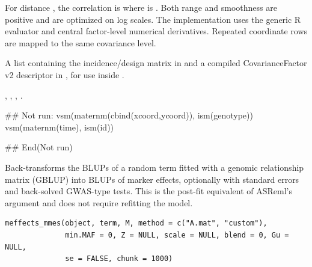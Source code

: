 \documentclass[a4paper]{book}
\begin{document}
%
\begin{Details}\relax
For distance , the correlation is  where \eqn{\phi}{} is .  Both range and smoothness are positive and are optimized on log scales.  The implementation uses the generic R evaluator and central factor-level numerical derivatives.  Repeated coordinate rows are mapped to the same covariance level.
\end{Details}
%
\begin{Value}
A list containing the incidence/design matrix in  and a compiled CovarianceFactor v2 descriptor in , for use inside .
\end{Value}
%
\begin{SeeAlso}\relax
{}, , , .
\end{SeeAlso}
%
\begin{Examples}
\begin{ExampleCode}
## Not run: 
vsm(maternm(cbind(xcoord,ycoord)), ism(genotype))
vsm(maternm(time), ism(id))

## End(Not run)
\end{ExampleCode}
\end{Examples}
%
\begin{Description}\relax
Back-transforms the BLUPs of a random term fitted with a genomic relationship
matrix (GBLUP) into BLUPs of marker effects, optionally with standard errors
and back-solved GWAS-type tests. This is the post-fit equivalent of ASReml's
 argument and does not require refitting the model.
\end{Description}
%
\begin{Usage}
\begin{verbatim}
meffects_mmes(object, term, M, method = c("A.mat", "custom"),
              min.MAF = 0, Z = NULL, scale = NULL, blend = 0, Gu = NULL,
              se = FALSE, chunk = 1000)
\end{verbatim}
\end{Usage}
%
\end{document}
